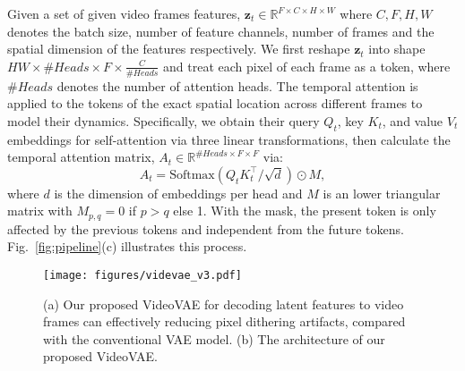 \documentclass[10pt,twocolumn,letterpaper]{article}
\def\vz{{\bm{z}}}
\begin{document}
Given a set of given video frames features, $\vz_t \in \mathbb{R}^{F\times C\times H \times W}$ where $C, F, H, W$ denotes the batch size, number of feature channels, number of frames and the spatial dimension of the features respectively. We first reshape $\vz_t$ into shape $HW \times \textit{\#Heads} \times F \times \frac{C}{\textit{\#Heads}}$ and treat each pixel of each frame as a token, where $\textit{\#Heads}$  denotes the number of attention heads.
The temporal attention is applied to the tokens of the exact spatial location across different frames to model their dynamics. 
Specifically,  we obtain their query $Q_t$, key $K_t$, and value $V_t$ embeddings for self-attention via three linear transformations, then calculate the temporal attention  matrix, $A_t \in \mathbb{R}^{\textit{\#Heads}\times F \times F}$ via:
\begin{equation}
     A_t =  \text{Softmax}(Q_t K^\top_t/\sqrt{d}) \odot M, 
\end{equation}
where $d$ is the dimension of   embeddings per head and $M$ is an lower triangular  matrix with   $M_{p,q} = 0$  if $p > q$ else 1. With the   mask, the present token is only affected by the previous tokens and independent from the future tokens. Fig.~\ref{fig:pipeline}(c) illustrates this process.
  


\begin{figure}[t]
\small
\centering
    \begin{minipage}{1.02\linewidth}
        \centering
        \texttt{[image: figures/videvae\_v3.pdf]}
    \end{minipage}\hfill
\caption{{(a) Our proposed VideoVAE for decoding latent features to video frames can effectively  reducing pixel dithering artifacts, compared with the conventional VAE model. (b) The architecture of our proposed VideoVAE. }
\vspace{-3mm}
}
\label{fig:videovae}
\end{figure}
\end{document}
